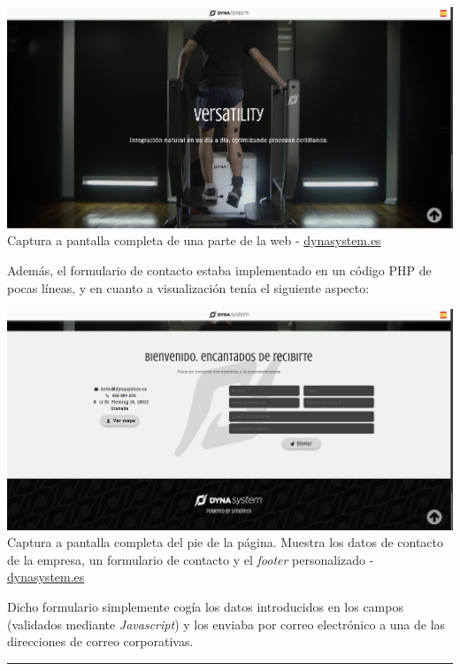 \documentclass[13pt]{scrartcl}
\begin{document}
				\begin{center}
					\includegraphics[scale=0.2]{images/web-parallax-screenshot.png}\\
					Captura a pantalla completa de una parte de la web - \href{https://www.dynasystem.es}{dynasystem.es}
				\end{center}
			
				Además, el formulario de contacto estaba implementado en un código PHP de pocas líneas, y en cuanto a visualización tenía el siguiente aspecto:
				
				\begin{center}
					\includegraphics[scale=0.2]{images/web-form-screenshot.png}\\
					Captura a pantalla completa del pie de la página. Muestra los datos de contacto de la empresa, un formulario de contacto y el \textit{footer} personalizado - \href{https://www.dynasystem.es}{dynasystem.es}
				\end{center}
			
				Dicho formulario simplemente cogía los datos introducidos en los campos (validados mediante \textit{Javascript}) y los enviaba por correo electrónico a una de las direcciones de correo corporativas.
			
				\noindent\rule{\textwidth}{0.4pt}\\
				
\end{document}
